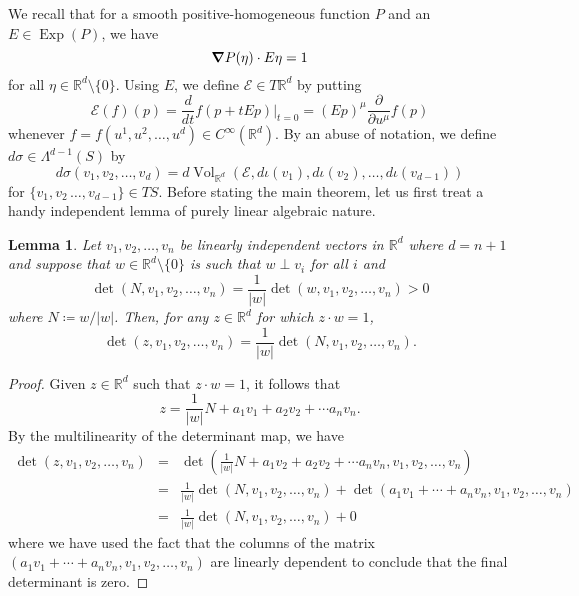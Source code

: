 \documentclass{article}
\newcommand\Exp{\operatorname{Exp}}
\renewcommand\det{\operatorname{det}}
\newcommand{\p}{\partial}
\newcommand{\R}{\mathbb{R}}
\newcommand{\f}[2]{\frac{#1}{#2}}
\newcommand{\lp}{\left(}
\newcommand{\rp}{\right)}
\theoremstyle{theorem}
\newtheorem{lemma}[theorem]{Lemma}
\newcommand{\Vol}{\operatorname{Vol}}
\begin{document}
\noindent We recall that for a smooth positive-homogeneous function $P$ and an $E\in \Exp(P)$, we have
\begin{equation*}
    \grad P(\eta) \cdot E\eta = 1
\end{equation*}
for all $\eta\in \R^d\setminus\{0\}$. Using $E$, we define $\mathcal{E}\in T\mathbb{R}^d$ by putting
\begin{equation*}
\mathcal{E}(f)(p)=\frac{d}{dt}f(p+tEp)\big\vert_{t=0}= (Ep)^\mu \f{\p}{\p u^\mu} f(p)
\end{equation*}
whenever $f=f(u^1,u^2,\dots,u^d)\in C^{\infty}(\mathbb{R}^d)$. By an abuse of notation, we define $d\sigma\in \Lambda^{d-1}(S)$ by
\begin{equation*}
d\sigma(v_1,v_2,\dots,v_d)=d\Vol_{\mathbb{R}^d}(\mathcal{E},d\iota(v_1),d\iota(v_2),\dots,d\iota(v_{d-1}))
\end{equation*}
for $\{v_1,v_2\,\dots,v_{d-1}\}\in TS$. Before stating the main theorem, let us first treat a handy independent lemma of purely linear algebraic nature.

\begin{lemma}\label{lem:determinants}
Let $v_1,v_2,\dots,v_n$ be linearly independent vectors in $\mathbb{R}^d$ where $d=n+1$ and suppose that $w\in\mathbb{R}^d \setminus\{0\}$ is such that $w\perp v_i$ for all $i$ and 
\begin{equation*}
\det(N, v_1,v_2,\dots,v_n)=\frac{1}{|w|}\det(w,v_1,v_2,\dots,v_n)>0
\end{equation*}
where $N\coloneqq w/|w|$. Then, for any $z\in\mathbb{R}^d$ for which $z\cdot w=1$,
\begin{equation*}
\det(z, v_1,v_2,\dots,v_n)=\frac{1}{|w|}\det(N,v_1,v_2,\dots,v_n).
\end{equation*}
\end{lemma}

\begin{proof}
Given $z\in\mathbb{R}^d$ such that $z\cdot w=1$, it follows that 
\begin{equation*}
z=\frac{1}{|w|}N+a_1v_1+a_2v_2+\cdots a_nv_n.
\end{equation*}
By the multilinearity of the determinant map, we have
\begin{eqnarray*}
\det(z,v_1,v_2,\dots,v_n) &=&\det\lp \frac{1}{|w|}N+a_1v_2+a_2v_2+\cdots a_n v_n,v_1,v_2,\dots,v_n\rp\\
&=&\frac{1}{|w|}\det(N,v_1,v_2,\dots,v_n)+\det(a_1v_1+\cdots+a_n v_n, v_1,v_2,\dots,v_n)\\
&=&\frac{1}{|w|}\det(N, v_1,v_2,\dots,v_n)+0
\end{eqnarray*}
where we have used the fact that the columns of the matrix $(a_1v_1+\cdots+a_n v_n, v_1,v_2,\dots,v_n)$ are linearly dependent to conclude that the final determinant is zero.
\end{proof}
\end{document}
